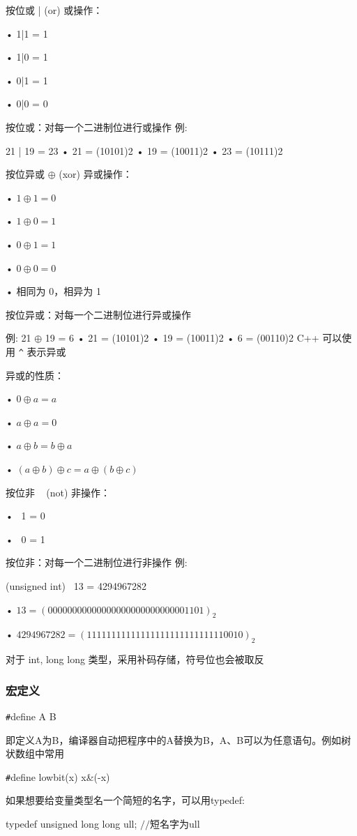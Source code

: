 \documentclass[UTF8]{ctexart}
\begin{document}
按位或 | (or) 或操作： 

• 1|1 = 1 

• 1|0 = 1 

• 0|1 = 1 

• 0|0 = 0 

按位或：对每一个二进制位进行或操作 例: 

21 | 19 = 23 • 21 = (10101)2 • 19 = (10011)2 • 23 = (10111)2

按位异或 $\oplus$  (xor) 异或操作： 

•  $1 \oplus 1 = 0$

•  $1 \oplus 0 = 1$

•  $0 \oplus 1 = 1$

•  $0 \oplus 0 = 0$

• 相同为 0，相异为 1 

按位异或：对每一个二进制位进行异或操作 

例: 21 $\oplus$ 19 = 6 • 21 = (10101)2 • 19 = (10011)2 • 6 = (00110)2 		C++ 可以使用 \verb|^| 表示异或

异或的性质： 

• $0 \oplus a = a$ 

• $a \oplus a = 0$

• $a \oplus b = b \oplus a$

• $(a \oplus b) \oplus c = a \oplus (b \oplus c)$

按位非 ~ (not) 非操作： 

• ~1 = 0 

• ~0 = 1 

按位非：对每一个二进制位进行非操作 例: 

(unsigned int) ~13 = 4294967282 

• $13 = (00000000000000000000000000001101)_2$

• $4294967282 = (11111111111111111111111111110010)_2$

对于 int, long long 类型，采用补码存储，符号位也会被取反

\subsubsection{宏定义}
\verb|#|define A B

即定义A为B，编译器自动把程序中的A替换为B，A、B可以为任意语句。例如树状数组中常用

\verb|#|define lowbit(x) x\&(-x)

如果想要给变量类型名一个简短的名字，可以用typedef:

typedef unsigned long long ull; $//$短名字为ull
\end{document}
